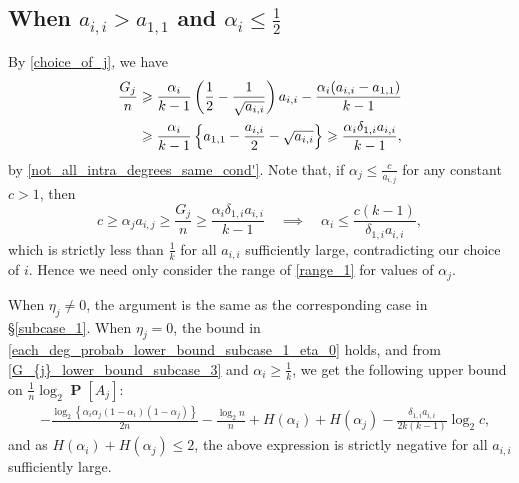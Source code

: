 \documentclass[11pt,reqno]{amsart}
\theoremstyle{definition}
\theoremstyle{remark}
\theoremstyle{conjecture}
\DeclareMathOperator{\Prob}{\mathbf{P}}
\begin{document}
\subsection{When $a_{i,i} > a_{1,1}$ and $\alpha_{i} \leqslant \frac{1}{2}$}\label{subcase_3} By \eqref{choice_of_j}, we have
\begin{align}\label{G_{j}_lower_bound_subcase_3}
\frac{G_{j}}{n} &\geqslant \frac{\alpha_{i}}{k-1}\left(\frac{1}{2} - \frac{1}{\sqrt{a_{i,i}}}\right) a_{i,i} - \frac{\alpha_{i} (a_{i,i} - a_{1,1})}{k-1} \nonumber\\
&\geqslant \frac{\alpha_{i}}{k-1}\left\{a_{1,1} - \frac{a_{i,i}}{2} - \sqrt{a_{i,i}}\right\} \geqslant \frac{\alpha_{i} \delta_{1,i} a_{i,i}}{k-1},
\end{align}
by \eqref{not_all_intra_degrees_same_cond'}. Note that, if $\alpha_{j} \leqslant \frac{c}{a_{i,j}}$ for any constant $c > 1$, then 
\begin{equation}
c \geqslant \alpha_{j} a_{i,j} \geqslant \frac{G_{j}}{n} \geqslant \frac{\alpha_{i} \delta_{1,i} a_{i,i}}{k-1} \quad \implies \quad \alpha_{i} \leqslant \frac{c (k-1)}{\delta_{1,i} a_{i,i}},\nonumber
\end{equation}
which is strictly less than $\frac{1}{k}$ for all $a_{i,i}$ sufficiently large, contradicting our choice of $i$. Hence we need only consider the range of \eqref{range_1} for values of $\alpha_{j}$.

When $\eta_{j} \neq 0$, the argument is the same as the corresponding case in \S\ref{subcase_1}. When $\eta_{j} = 0$, the bound in \eqref{each_deg_probab_lower_bound_subcase_1_eta_0} holds, and from \eqref{G_{j}_lower_bound_subcase_3} and $\alpha_{i} \geqslant \frac{1}{k}$, we get the following upper bound on $\frac{1}{n} \log_{2} \Prob[A_{j}]$:
\begin{align}
& -\frac{\log_{2}\left\{\alpha_{i} \alpha_{j} (1-\alpha_{i}) (1-\alpha_{j})\right\}}{2n} - \frac{\log_{2} n}{n} + H(\alpha_{i}) + H(\alpha_{j}) - \frac{\delta_{1,i} a_{i,i}}{2 k (k-1)} \log_{2} c, \nonumber
\end{align}
and as $H(\alpha_{i}) + H(\alpha_{j}) \leqslant 2$, the above expression is strictly negative for all $a_{i,i}$ sufficiently large.



\end{document}
